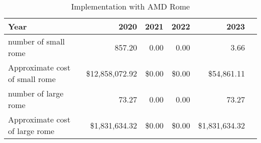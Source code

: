 \tiny \begin{longtable} { |p{}  |r  |r  |r  |r  |r |} 
\caption{Implementation with AMD Rome \label{tab:Rome}}\\ 
\hline 
\textbf{Year}&\textbf{2020}&\textbf{2021}&\textbf{2022}&\textbf{2023} \\ \hline
{number of small rome }&{857.20}&{0.00}&{0.00}&{3.66} \\ \hline
{Approximate cost of small rome }&{\$12,858,072.92}&{\$0.00}&{\$0.00}&{\$54,861.11} \\ \hline
{number of large rome }&{73.27}&{0.00}&{0.00}&{73.27} \\ \hline
{Approximate cost of large rome }&{\$1,831,634.32}&{\$0.00}&{\$0.00}&{\$1,831,634.32} \\ \hline
\end{longtable} \normalsize
